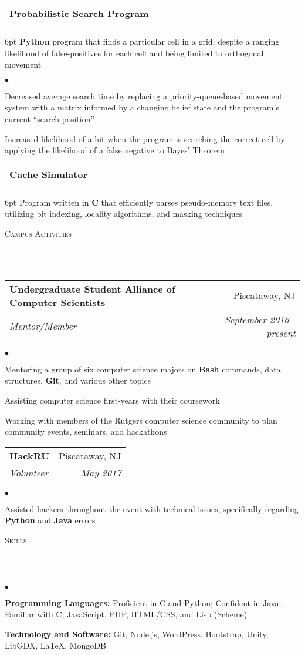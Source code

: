 \documentclass[12pt]{article}
\makeatletter
\newcommand{\lineunder}{
	\vspace*{-8pt} \\ 
	\hspace*{-18pt} 
	\hrulefill \\
}
\newcommand{\header}[1]{
	\vspace*{2pt}
	{\hspace*{-14pt}\vspace*{6pt} \textsc{#1}} 
	\vspace*{-6pt} 
	\lineunder
}
\newenvironment{achievements}{
  \begin{list}{$\bullet$}{
  	\topsep 0pt \itemsep -4pt}}
  	{\vspace*{2pt}\end{list}
}
\def\cpp{
	{\hspace{-0.25em}C\nolinebreak[4]\hspace{-.05em}\raisebox{.4ex}{\tiny		\bf ++}}}
\newcommand{\subheading}[4]{
 	\vspace{5pt}
    	\begin{tabular*}{1.01\textwidth}{l@{\extracolsep{\fill}}r}
      		\textbf{#1} & #2 \\
      		\textit{\small#3} & \textit{\small #4} \\
    	\end{tabular*}\vspace{-5pt}
}
\makeatother
\begin{document}
\subheading{Probabilistic Search Program}{}{}{}
	\vspace{-15pt}	
	\begin{adjustwidth}{6pt}{}
	\textbf{Python} program that finds a particular cell in a grid, despite a ranging likelihood of false-positives for each cell and being limited to orthogonal movement
	\end{adjustwidth}
	\begin{achievements}
		\item Decreased average search time by replacing a priority-queue-based movement system with a matrix informed by a changing belief state and the program's current \textquotedblleft search position\textquotedblright
		\item Increased likelihood of a hit when the program is searching the correct cell by applying the likelihood of a false negative to Bayes' Theorem
	\end{achievements}
	
\subheading{Cache Simulator}{}{}{}
	\vspace{-15pt}
	\begin{adjustwidth}{6pt}{}
	Program written in \textbf{C} that efficiently parses pseudo-memory text files, utilizing bit indexing, locality algorithms, and masking techniques
	\end{adjustwidth}
\vspace*{4pt}


\header{Campus Activities}

\subheading
	{Undergraduate Student Alliance of Computer Scientists}{Piscataway, NJ}
	{Mentor/Member}{September 2016 - \textit{present}}
	\begin{achievements}
		\item Mentoring a group of six computer science majors on \textbf{Bash} commands, data structures, \textbf{Git}, and various other topics
		\item Assisting computer science first-years with their coursework
		\item Working with members of the Rutgers computer science community to plan community events, seminars, and hackathons
	\end{achievements}
	
\subheading
	{HackRU}{Piscataway, NJ}
	{Volunteer}{May 2017}
	\begin{achievements}
		\item Assisted hackers throughout the event with technical issues, specifically regarding \textbf{Python} and \textbf{Java} errors
	\end{achievements}

	
\header{Skills}
	\begin{achievements}
		\item{\bf Programming Languages:} Proficient in C and Python; Confident in Java; \newline Familiar with \cpp, JavaScript, PHP, HTML/CSS, and Lisp (Scheme)
		\item{\bf Technology and Software:} Git, Node.js, WordPress, Bootstrap, Unity, LibGDX, \LaTeX, MongoDB
	\end{achievements}
\end{document}
